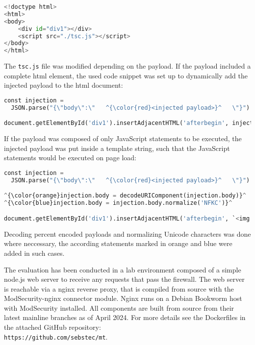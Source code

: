 \begin{lstlisting}[style=basicStyle, language=Python, caption=\acrshort{html} file used for payload validation]
<!doctype html>
<html>
<body>
	<div id="div1"></div>
	<script src="./tsc.js"></script>
</body>
</html>
\end{lstlisting}

The \verb|tsc.js| file was modified depending on the payload. If the payload included a complete \acrshort{html} element, the used code snippet was set up to dynamically add the injected payload to the \acrshort{html} document:

\begin{lstlisting}[style=basicStyle, language=Python, escapeinside=\^\^, caption=Script used to validate payloads containing full \acrshort{html} elements]
const injection = 
  JSON.parse("{\"body\":\"   ^{\color{red}<injected payload>}^   \"}")

document.getElementById('div1').insertAdjacentHTML('afterbegin', injection.body)
\end{lstlisting}

If the payload was composed of only JavaScript statements to be executed, the injected payload was put inside a template string, such that the JavaScript statements would be executed on page load:

\begin{lstlisting}[style=basicStyle, language=Python, escapeinside=\^\^, caption=Script used to validate payloads containing only JavaScript statements]
const injection = 
  JSON.parse("{\"body\":\"   ^{\color{red}<injected payload>}^   \"}")

^{\color{orange}injection.body = decodeURIComponent(injection.body)}^
^{\color{blue}injection.body = injection.body.normalize('NFKC')}^

document.getElementById('div1').insertAdjacentHTML('afterbegin', `<img src=0 onerror=${injection.body}>`)
\end{lstlisting}

Decoding percent encoded payloads and normalizing Unicode characters was done where neccessary, the according statements marked in orange and blue were added in such cases. 

The evaluation has been conducted in a lab environment composed of a simple node.js web server to receive any requests that pass the firewall.
The web server is reachable via a nginx reverse proxy, that is compiled from source with the ModSecurity-nginx connector module. Nginx runs on a Debian Bookworm host with ModSecurity installed.
All components are built from source from their latest mainline branches as of April 2024.
For more details see the Dockerfiles in the attached GitHub repository:\\ \verb|https://github.com/sebstec/mt|. \\

